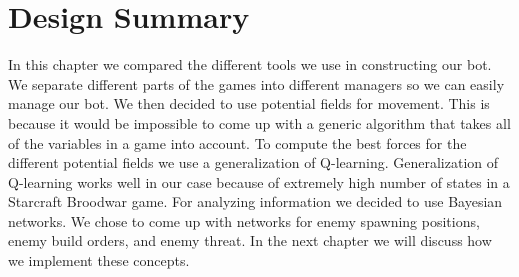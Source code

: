 \section{Design Summary}
In this chapter we compared the different tools we use in constructing our bot. We separate different parts of the games into different managers so we can easily manage our bot. We then decided to use potential fields for movement. This is because it would be impossible to come up with a generic algorithm that takes all of the variables in a game into account. To compute the best forces for the different potential fields we use a generalization of Q-learning. Generalization of Q-learning works well in our case because of extremely high number of states in a Starcraft Broodwar game. For analyzing information we decided to use Bayesian networks. We chose to come up with networks for enemy spawning positions, enemy build orders, and enemy threat. In the next chapter we will discuss how we implement these concepts. 